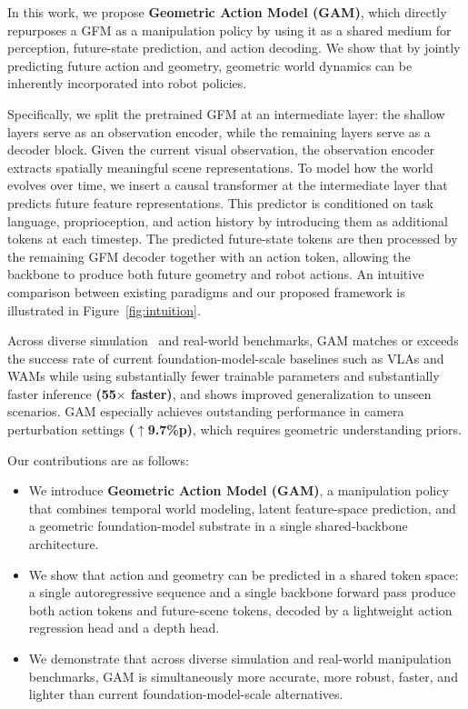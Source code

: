 In this work, we propose \textbf{Geometric Action Model (GAM)}, which directly repurposes a GFM as a manipulation policy by using it as a shared medium for perception, future-state prediction, and action decoding. We show that by jointly predicting future action and geometry, geometric world dynamics can be inherently incorporated into robot policies.

Specifically, we split the pretrained GFM at an intermediate layer: the shallow layers serve as an observation encoder, while the remaining layers serve as a decoder block. Given the current visual observation, the observation encoder extracts spatially meaningful scene representations. To model how the world evolves over time, we insert a causal transformer at the intermediate layer that predicts future feature representations. This predictor is conditioned on task language, proprioception, and action history by introducing them as additional tokens at each timestep. The predicted future-state tokens are then processed by the remaining GFM decoder together with an action token, allowing the backbone to produce both future geometry and robot actions. An intuitive comparison between existing paradigms and our proposed framework is illustrated in Figure~\ref{fig:intuition}.


Across diverse simulation~\citep{liu2023libero,fei2025libero,nasiriany2024robocasa} and real-world benchmarks, GAM matches or exceeds the success rate of current foundation-model-scale baselines such as VLAs and WAMs while using substantially fewer trainable parameters and substantially faster inference \textbf{(55$\times$ faster)}, and shows improved generalization to unseen scenarios. GAM especially achieves outstanding performance in camera perturbation settings \textbf{($\uparrow$9.7\%p)}, which requires geometric understanding priors. 

Our contributions are as follows:
\begin{itemize}
    \item We introduce \textbf{Geometric Action Model (GAM)}, a manipulation policy that combines temporal world modeling, latent feature-space prediction, and a geometric foundation-model substrate in a single shared-backbone architecture.
    \item We show that action and geometry can be predicted in a shared token space: a single autoregressive sequence and a single backbone forward pass produce both action tokens and future-scene tokens, decoded by a lightweight action regression head and a depth head.
    \item We demonstrate that across diverse simulation and real-world manipulation benchmarks, GAM is simultaneously more accurate, more robust, faster, and lighter than current foundation-model-scale alternatives.
\end{itemize}